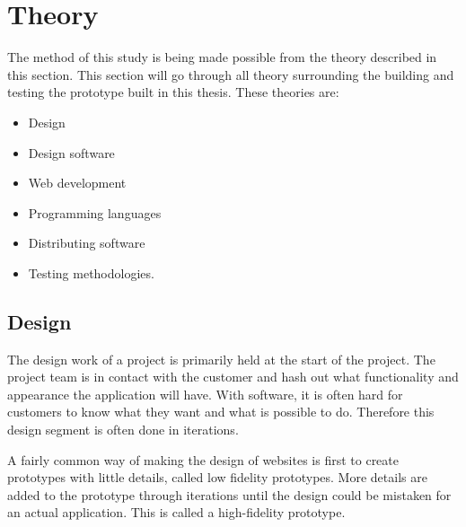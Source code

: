 \section{Theory}

The method of this study is being made possible from the theory described in this section. This section will go through all theory surrounding the building and testing the prototype built in this thesis. These theories are: 
\begin{itemize}
  \item Design
  \item Design software
  \item Web development
  \item Programming languages
  \item Distributing software
  \item Testing methodologies. 
\end{itemize}





\subsection{Design}%
\label{sub:Design}
The design work of a project is primarily held at the start of the project. The project team is in contact with the customer and hash out what functionality and appearance the application will have. With software, it is often hard for customers to know what they want and what is possible to do. Therefore this design segment is often done in iterations.

A fairly common way of making the design of websites is first to create prototypes with little details, called low fidelity prototypes. More details are added to the prototype through iterations until the design could be mistaken for an actual application. This is called a high-fidelity prototype.

